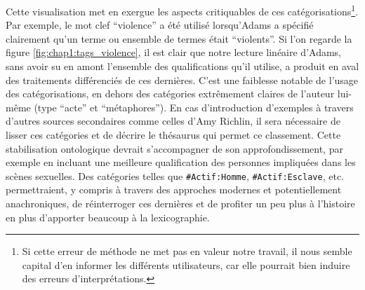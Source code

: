 Cette visualisation met en exergue les aspects critiquables de ces catégorisations\footnote{Si cette erreur de méthode ne met pas en valeur notre travail, il nous semble capital d'en informer les différents utilisateurs, car elle pourrait bien induire des erreurs d'interprétations.}. Par exemple, le mot clef \enquote{violence} a été utilisé lorsqu'Adams a spécifié clairement qu'un terme ou ensemble de termes était \enquote{violents}. Si l'on regarde la figure \ref{fig:chap1:tags_violence}, il est clair que notre lecture linéaire d'Adams, sans avoir su en amont l'ensemble des qualifications qu'il utilise, a produit en aval des traitements différenciés de ces dernières. C'est une faiblesse notable de l'usage des catégorisations, en dehors des catégories extrêmement claires de l'auteur lui-même (type \enquote{acte} et \enquote{métaphores}). En cas d'introduction d'exemples à travers d'autres sources secondaires comme celles d'Amy Richlin, il sera nécessaire de lisser ces catégories et de décrire le thésaurus qui permet ce classement. Cette stabilisation ontologique devrait s'accompagner de son approfondissement, par exemple en incluant une meilleure qualification des personnes impliquées dans les scènes sexuelles. Des catégories telles que \texttt{\#Actif:Homme}, \texttt{\#Actif:Esclave}, etc. permettraient, y compris à travers des approches modernes et potentiellement anachroniques, de réinterroger ces dernières et de profiter un peu plus à l'histoire en plus d'apporter beaucoup à la lexicographie.

